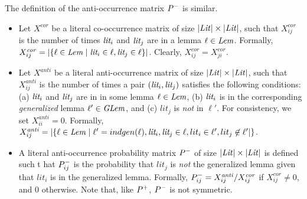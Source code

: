 The definition of the anti-occurrence matrix $P^-$ is similar. \newcommand{\xcor}{X^\mathit{cor}}
\newcommand{\xanti}{X^{\mathit{anti}}}
\begin{itemize}
    \item Let $\xcor$ be a literal co-occurrence matrix of size $|\mathit{Lit}| \times |\mathit{Lit}|$, such that $\xcor_{ij}$ is the number of times $\textit{lit}_i$ and $\textit{lit}_j$ are in a lemma $\ell \in \mathit{Lem}$. Formally, $\xcor_{ij} = |\{ \ell \in \Lem \mid \lit_i \in \ell, \lit_j \in \ell\}|$. Clearly, $\xcor_{ij} = \xcor_{ji}$.
    \item  Let $\xanti$ be a literal anti-occurrence matrix of size $|\mathit{Lit}| \times |\mathit{Lit}|$, such that $\xanti_{ij}$ is the number of times a pair $(\textit{lit}_i, \textit{lit}_j)$ satisfies the following conditions: (a) $\textit{lit}_i$ and $\textit{lit}_j$ are in in some lemma $\ell \in \mathit{Lem}$, (b) $\textit{lit}_i$ is in the corresponding \emph{generalized} lemma $\ell' \in \mathit{GLem}$, and (c) $lit_j$ is \emph{not} in $\ell'$. For consistency, we set $\xanti_{ii} = 0$. Formally, $\xanti_{ij} = |\{ \ell \in \Lem 
    \mid 
    \ell' = indgen(\ell), 
    \lit_i,\lit_j \in \ell,  
    lit_i \in \ell', lit_j \not\in \ell'|\}$.
    \item     A literal anti-occurrence probability matrix $P^-$ of size $|\mathit{Lit}| \times |\mathit{Lit}|$ is defined such t hat $P^-_{ij}$ is the probability that $lit_j$ is \emph{not} the generalized lemma given that $lit_i$ is in the generalized lemma. Formally, $\Pneg_{ij} = \xanti_{ij}/\xcor_{ij}$ if $\xcor_{ij} \neq 0$, and $0$ otherwise. Note that, like $P^+$, $P^-$ is not symmetric.
\end{itemize}



     
    

